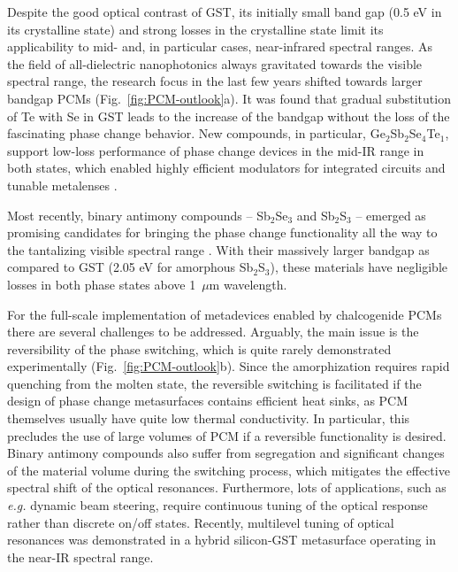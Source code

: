 \documentclass[journal=chreay,manuscript=review]{achemso}
\begin{document}
Despite the good optical contrast of GST, its initially small band gap (0.5 eV in its crystalline state) and strong losses in the crystalline state limit its applicability to mid- and, in particular cases, near-infrared spectral ranges. As the field of all-dielectric nanophotonics always gravitated towards the visible spectral range, the research focus in the last few years shifted towards larger bandgap PCMs (Fig.~\ref{fig:PCM-outlook}a). It was found that gradual substitution of Te with Se in GST leads to the increase of the bandgap without the loss of the fascinating phase change behavior. New compounds, in particular, Ge$_2$Sb$_2$Se$_4$Te$_1$, support low-loss performance of phase change devices in the mid-IR range in both states, which enabled highly efficient modulators for integrated circuits \cite{zhang2019broadband}  and tunable metalenses \cite{shalaginov2021reconfigurable}.

Most recently, binary antimony compounds – Sb$_2$Se$_3$ and Sb$_2$S$_3$ – emerged as promising candidates for bringing the phase change functionality all the way to the tantalizing visible spectral range \cite{dong2019wide,lu2021reversible}. With their massively larger bandgap as compared to GST (2.05 eV for amorphous Sb$_2$S$_3$), these materials have negligible losses in both phase states above 1~$\mu$m wavelength. 


For the full-scale implementation of metadevices enabled by chalcogenide PCMs there are several challenges to be addressed. Arguably, the main issue is the reversibility of the phase switching, which is quite rarely demonstrated experimentally\cite{galarreta2020reconfigurable,rybin2021optically} (Fig.~\ref{fig:PCM-outlook}b).  Since the amorphization requires rapid quenching from the molten state, the reversible switching is facilitated if the design of phase change metasurfaces contains efficient heat sinks, as PCM themselves usually have quite low thermal conductivity. In particular, this precludes the use of large volumes of PCM if a reversible functionality is desired. Binary antimony compounds also suffer from segregation and significant changes of the material volume during the switching process, which mitigates the effective spectral shift of the optical resonances. Furthermore, lots of applications, such as \textit{e.g.} dynamic beam steering, require continuous tuning of the optical response rather than discrete on/off states. Recently, multilevel tuning of optical resonances was demonstrated in a hybrid silicon-GST metasurface operating in the near-IR spectral range\cite{galarreta2020reconfigurable}.
\end{document}
